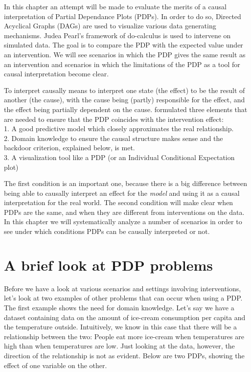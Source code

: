 \documentclass[
]{krantz}
\begin{document}
In this chapter an attempt will be made to evaluate the merits of a causal interpretation of Partial Dependance Plots (PDPs). In order to do so, Directed Acyclical Graphs (DAGs) are used to visualize various data generating mechanisms. Judea Pearl's framework of do-calculus is used to intervene on simulated data. The goal is to compare the PDP with the expected value under an intervention. We will see scenarios in which the PDP gives the same result as an intervention and scenarios in which the limitations of the PDP as a tool for causal interpretation become clear.

To interpret causally means to interpret one state (the effect) to be the result of another (the cause), with the cause being (partly) responsible for the effect, and the effect being partially dependent on the cause. \citep{zhaohastie} formulated three elements that are needed to ensure that the PDP coincides with the intervention effect:\\
1. A good predictive model which closely approximates the real relationship.\\
2. Domain knowledge to ensure the causal structure makes sense and the backdoor criterion, explained below, is met.\\
3. A visualization tool like a PDP (or an Individual Conditional Expectation plot)

The first condition is an important one, because there is a big difference between being able to causally interpret an effect for the \emph{model} and using it as a causal interpretation for the real world. The second condition will make clear when PDPs are the same, and when they are different from interventions on the data. In this chapter we will systematically analyze a number of scenarios in order to see under which conditions PDPs can be causally interpreted or not.

\hypertarget{a-brief-look-at-pdp-problems}{%
\section{A brief look at PDP problems}\label{a-brief-look-at-pdp-problems}}

Before we have a look at various scenarios and settings involving interventions, let's look at two examples of other problems that can occur when using a PDP. The first example shows the need for domain knowledge. Let's say we have a dataset containing data on the amount of ice-cream consumption per capita and the temperature outside. Intuitively, we know in this case that there will be a relationship between the two: People eat more ice-cream when temperatures are high than when temperatures are low. Just looking at the data, however, the direction of the relationship is not as evident. Below are two PDPs, showing the effect of one variable on the other.
\end{document}

